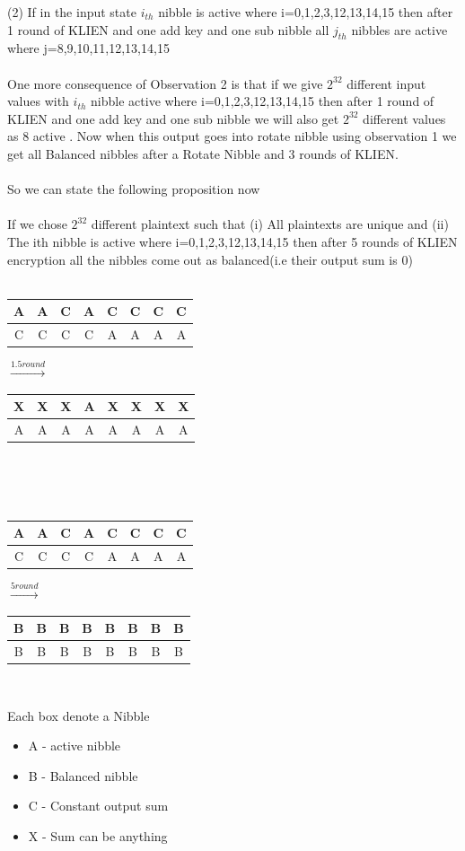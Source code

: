 \documentclass[preprint]{transcrypto}
\begin{document}
(2) If in the input state $i_{th}$ nibble is active where i=0,1,2,3,12,13,14,15 then after 1 round of KLIEN and one add key and one sub nibble all $j_{th}$ nibbles are active where j=8,9,10,11,12,13,14,15\\ \\
One more consequence of Observation 2 is that if we give $2^{32}$ different input values with $i_{th}$ nibble  active where i=0,1,2,3,12,13,14,15 then after 1 round of KLIEN and one add key and one sub nibble we will also get $2^32$ different values as 8 active . Now when this output goes into rotate nibble using observation 1 we get all Balanced nibbles after a Rotate Nibble and 3 rounds of KLIEN.\\ \\
So we can state the following proposition now 
\\ \\
If we chose $2^{32}$ different plaintext such that (i) All plaintexts are unique and (ii) The ith nibble is active where i=0,1,2,3,12,13,14,15  then after 5 rounds of KLIEN encryption all the nibbles come out as balanced(i.e their output sum is 0)\\ \vspace{0.1\linewidth}\\
\begin{tabular}{|c|c|c|c|c|c|c|c|}
	\hline
	A & A & C & A & C & C & C & C \\
	\hline
	C & C & C & C & A & A & A & A\\
	\hline
\end{tabular}
$\xrightarrow{1.5round}$
\begin{tabular}{|c|c|c|c|c|c|c|c|}
	\hline
	X & X & X & A & X & X & X & X \\
	\hline
	A & A & A & A & A & A & A & A\\
	\hline
\end{tabular}\\
\\ \vspace{0.1\linewidth}\\
\begin{tabular}{|c|c|c|c|c|c|c|c|}
	\hline
	A & A & C & A & C & C & C & C \\
	\hline
	C & C & C & C & A & A & A & A\\
	\hline
\end{tabular}
$\xrightarrow{5round}$
\begin{tabular}{|c|c|c|c|c|c|c|c|}
	\hline
	B & B & B & B & B & B & B & B \\
	\hline
	B & B & B & B & B & B & B & B\\
	\hline
\end{tabular}
\\ 
\begin{center}
	Each box denote a Nibble \\
	\begin{itemize}
		\item A - active nibble
		\item B - Balanced nibble
		\item C - Constant output sum
		\item X - Sum can be anything
	\end{itemize}
\end{center}
\end{document}
